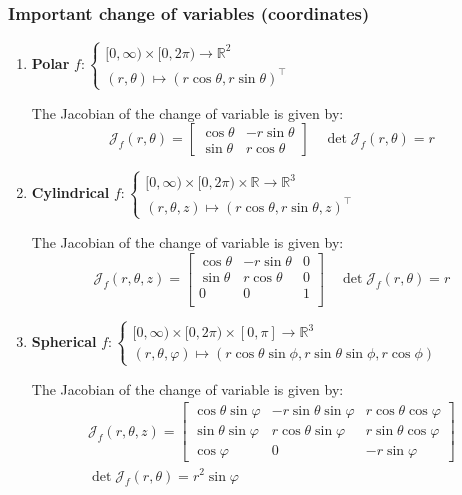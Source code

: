 \documentclass[a4paper, 10pt]{article}
\theoremstyle{definition}
\newcommand{\R}{\mathbb{R}}
\newcommand{\J}{\mathcal{J}}
\begin{document}
\subsubsection*{Important change of variables (coordinates)}
\begin{enumerate}[leftmargin=0pt]
    \item \textbf{Polar}  \(f :\begin{cases}
        [0, \infty) \times [0, 2\pi) \to \R^2 \\
        (r, \theta) \mapsto (r \cos \theta, r \sin \theta)^\top
    \end{cases}\)
    
    The Jacobian of the change of variable is given by:
    \[\J_f(r, \theta) = \begin{bmatrix}
        \cos \theta & -r \sin \theta \\
        \sin \theta & r \cos \theta
    \end{bmatrix} \quad \det \J_f(r, \theta) = r\]

    \item \textbf{Cylindrical}  \(f :\begin{cases}
        [0, \infty) \times [0, 2\pi) \times \R \to \R^3 \\
        (r, \theta, z) \mapsto (r \cos \theta, r \sin \theta, z)^\top
    \end{cases}\)
    
    The Jacobian of the change of variable is given by:
    \[\J_f(r, \theta, z) = \begin{bmatrix}
        \cos \theta & -r \sin \theta & 0\\
        \sin \theta & r \cos \theta & 0 \\
        0 & 0 & 1 \\
    \end{bmatrix} \quad \det \J_f(r, \theta) = r\]

    \item \textbf{Spherical} \(f :\begin{cases}
        [0, \infty) \times [0, 2\pi) \times [0, \pi] \to \R^3 \\
        (r, \theta, \varphi) \mapsto (r \cos \theta \sin \phi, r \sin \theta \sin \phi, r \cos \phi)
    \end{cases}\)
    
    The Jacobian of the change of variable is given by:
    \begin{gather*}
        \J_f(r, \theta, z) = \begin{bmatrix}
            \cos \theta \sin \varphi & -r \sin \theta \sin \varphi & r \cos \theta \cos \varphi \\
            \sin \theta \sin \varphi & r \cos \theta \sin \varphi & r \sin \theta \cos \varphi \\
            \cos \varphi & 0 & -r \sin \varphi
        \end{bmatrix} \\
        \det \J_f(r, \theta) = r^2 \sin \varphi
    \end{gather*}
\end{enumerate}
\end{document}
